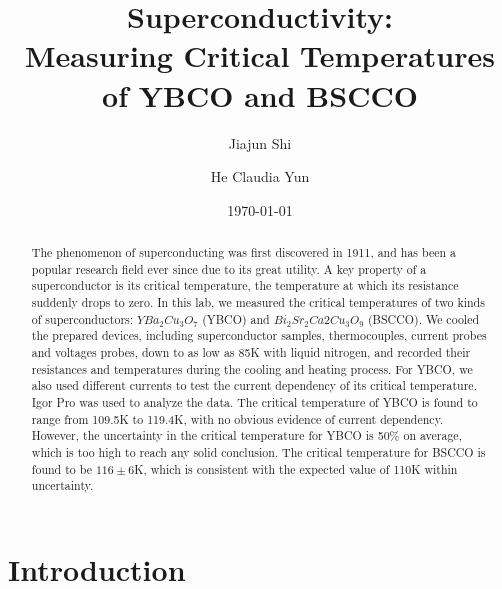 \documentclass[prb,preprint]{revtex4-1}
\begin{document}
\title{Superconductivity: \\Measuring Critical Temperatures of YBCO and BSCCO}

\author{Jiajun Shi}
\author{He Claudia Yun}


\date{\today}


\begin{abstract}
The phenomenon of superconducting was first discovered in 1911, and has been a popular research field ever since due to its great utility. A key property of a superconductor is its critical temperature, the temperature at which its resistance suddenly drops to zero. In this lab, we measured the critical temperatures of two kinds of superconductors: $YBa_{2}Cu_{3}O_{7}$ (YBCO) and $Bi_{2}Sr_{2}Ca{2}Cu_{3}O_{9}$ (BSCCO). We cooled the prepared devices, including superconductor samples, thermocouples, current probes and voltages probes, down to as low as 85K with liquid nitrogen, and recorded their resistances and temperatures during the cooling and heating process. For YBCO, we also used different currents to test the current dependency of its critical temperature. Igor Pro was used to analyze the data. The critical temperature of YBCO is found to range from 109.5K to 119.4K, with no obvious evidence of current dependency. However, the uncertainty in the critical temperature for YBCO is 50\% on average, which is too high to reach any solid conclusion. The critical temperature for BSCCO is found to be $116\pm6$K, which is consistent with the expected value of 110K within uncertainty.\\

\end{abstract}

\maketitle 

\section{Introduction}
\end{document}
